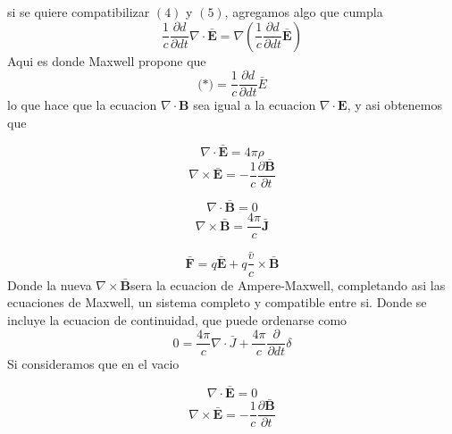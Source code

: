 \documentclass{article}
\begin{document}
	si se quiere compatibilizar \((4)\) y \((5)\), agregamos algo que cumpla
	\begin{equation*}
		\frac{1}{c}\frac{\partial d}{\partial dt}\nabla\cdot\mathbf{\bar{E}}=\nabla(\frac{1}{c}\frac{\partial d}{\partial dt}\mathbf{\bar{E}})
	\end{equation*}
	Aqui es donde Maxwell propone que 
	\begin{equation*}
		\text{(*)}=\frac{1}{c}\frac{\partial d}{\partial dt}\bar{E}
	\end{equation*}
	lo que hace que la ecuacion  \(\nabla \cdot \mathbf{B}\) sea igual a la ecuacion \(\nabla \cdot \mathbf{E}\), y asi obtenemos que
		\begin{minipage}{.5\textwidth}
		\begin{equation*}
			\nabla \cdot \mathbf{\bar{E}} = 4 \pi \rho
		\end{equation*}
		\begin{equation*}
			\nabla \times \mathbf{\bar{E}} = -\frac{1}{c} \frac{\partial \mathbf{\bar{B}}}{\partial t}
		\end{equation*}
	\end{minipage}%
	\begin{minipage}{.5\textwidth}
		\begin{equation*}
			\nabla \cdot \mathbf{\bar{B}} = 0
		\end{equation*}
		\begin{equation*}
			\nabla \times \mathbf{\bar{B}} = \frac{4\pi}{c} \mathbf{\bar{J}}
		\end{equation*}
	\end{minipage}
	\[
	\mathbf{\bar{F}} = q\mathbf{\bar{E}} + q\frac{\bar{v}}{c} \times \mathbf{\bar{B}}
	\]	
	Donde la nueva \(\nabla \times \mathbf{\bar{B}}\)sera la ecuacion de Ampere-Maxwell, completando asi las ecuaciones de Maxwell, un sistema completo y compatible entre si.	
	Donde se incluye la ecuacion de continuidad, que puede ordenarse como
	\begin{equation}
		0=\frac{4\pi}{c}\nabla\cdot\bar{J}+\frac{4\pi}{c}\frac{\partial}{\partial dt}\delta
	\end{equation}
	Si consideramos que en el vacio
	\begin{minipage}{.5\textwidth}
		\begin{equation*}
			\nabla \cdot \mathbf{\bar{E}} = 0
		\end{equation*}
		\begin{equation*}
			\nabla \times \mathbf{\bar{E}} = -\frac{1}{c} \frac{\partial \mathbf{\bar{B}}}{\partial t}
		\end{equation*}
	\end{minipage}%
\end{document}
